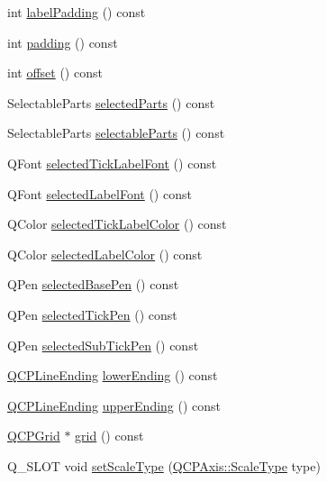 \begin{DoxyCompactItemize}
\item 
int \mbox{\hyperlink{class_q_c_p_axis_a6d9a9fe1c7166f209fb1e25686390451}{label\+Padding}} () const
\item 
int \mbox{\hyperlink{class_q_c_p_axis_a07df379d5c017b8f3a4702532eb037b2}{padding}} () const
\item 
int \mbox{\hyperlink{class_q_c_p_axis_aef66fa16353b4993b1cceabfb644a1a9}{offset}} () const
\item 
Selectable\+Parts \mbox{\hyperlink{class_q_c_p_axis_a893e8d6cfed9267eb2b793cb1d2b4dce}{selected\+Parts}} () const
\item 
Selectable\+Parts \mbox{\hyperlink{class_q_c_p_axis_a1d12d157756c114f4e57517c62177181}{selectable\+Parts}} () const
\item 
Q\+Font \mbox{\hyperlink{class_q_c_p_axis_a09817512bef8ddfb669a6828f9c855bc}{selected\+Tick\+Label\+Font}} () const
\item 
Q\+Font \mbox{\hyperlink{class_q_c_p_axis_a1399d614f7c307159bfec938a069203d}{selected\+Label\+Font}} () const
\item 
Q\+Color \mbox{\hyperlink{class_q_c_p_axis_a75f11d3031a11559f3e984e916fcde2c}{selected\+Tick\+Label\+Color}} () const
\item 
Q\+Color \mbox{\hyperlink{class_q_c_p_axis_a7adea64ef4b715e7a1c519fff2b110b8}{selected\+Label\+Color}} () const
\item 
Q\+Pen \mbox{\hyperlink{class_q_c_p_axis_a0d54314ab3053fd0fb77294a0e7f08cb}{selected\+Base\+Pen}} () const
\item 
Q\+Pen \mbox{\hyperlink{class_q_c_p_axis_a76b52a6d824ccf9a95eb024251e1b833}{selected\+Tick\+Pen}} () const
\item 
Q\+Pen \mbox{\hyperlink{class_q_c_p_axis_a73c147bb2c5598edbb842adc2da8a7bf}{selected\+Sub\+Tick\+Pen}} () const
\item 
\mbox{\hyperlink{class_q_c_p_line_ending}{Q\+C\+P\+Line\+Ending}} \mbox{\hyperlink{class_q_c_p_axis_a0cc60e5694ed4df6a2c3554e53ee6ae7}{lower\+Ending}} () const
\item 
\mbox{\hyperlink{class_q_c_p_line_ending}{Q\+C\+P\+Line\+Ending}} \mbox{\hyperlink{class_q_c_p_axis_a9feaf5f78286693e89221bc205f9389a}{upper\+Ending}} () const
\item 
\mbox{\hyperlink{class_q_c_p_grid}{Q\+C\+P\+Grid}} $\ast$ \mbox{\hyperlink{class_q_c_p_axis_a63f1dd2df663680d2a8d06c19592dd63}{grid}} () const
\item 
Q\+\_\+\+S\+L\+OT void \mbox{\hyperlink{class_q_c_p_axis_adef29cae617af4f519f6c40d1a866ca6}{set\+Scale\+Type}} (\mbox{\hyperlink{class_q_c_p_axis_a36d8e8658dbaa179bf2aeb973db2d6f0}{Q\+C\+P\+Axis\+::\+Scale\+Type}} type)

\end{DoxyCompactItemize}
